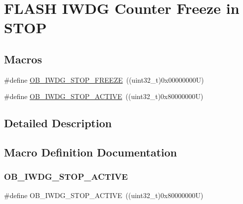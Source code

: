 \hypertarget{group___f_l_a_s_h_ex___option___bytes___i_w_d_g___f_r_e_e_z_e___s_t_o_p}{}\section{F\+L\+A\+SH I\+W\+DG Counter Freeze in S\+T\+OP}
\label{group___f_l_a_s_h_ex___option___bytes___i_w_d_g___f_r_e_e_z_e___s_t_o_p}
\subsection*{Macros}
\begin{DoxyCompactItemize}
\item 
\#define \mbox{\hyperlink{group___f_l_a_s_h_ex___option___bytes___i_w_d_g___f_r_e_e_z_e___s_t_o_p_gae0c882a6f14ebe5d1969b50d5a2dbb17}{O\+B\+\_\+\+I\+W\+D\+G\+\_\+\+S\+T\+O\+P\+\_\+\+F\+R\+E\+E\+ZE}}~((uint32\+\_\+t)0x00000000\+U)
\item 
\#define \mbox{\hyperlink{group___f_l_a_s_h_ex___option___bytes___i_w_d_g___f_r_e_e_z_e___s_t_o_p_gacbec0b12f9a0cebadcba12ed53891a2c}{O\+B\+\_\+\+I\+W\+D\+G\+\_\+\+S\+T\+O\+P\+\_\+\+A\+C\+T\+I\+VE}}~((uint32\+\_\+t)0x80000000\+U)
\end{DoxyCompactItemize}


\subsection{Detailed Description}


\subsection{Macro Definition Documentation}
\mbox{\label{group___f_l_a_s_h_ex___option___bytes___i_w_d_g___f_r_e_e_z_e___s_t_o_p_gacbec0b12f9a0cebadcba12ed53891a2c}} 
\subsubsection{\texorpdfstring{OB\_IWDG\_STOP\_ACTIVE}{OB\_IWDG\_STOP\_ACTIVE}}
{\footnotesize\ttfamily \#define O\+B\+\_\+\+I\+W\+D\+G\+\_\+\+S\+T\+O\+P\+\_\+\+A\+C\+T\+I\+VE~((uint32\+\_\+t)0x80000000\+U)}

